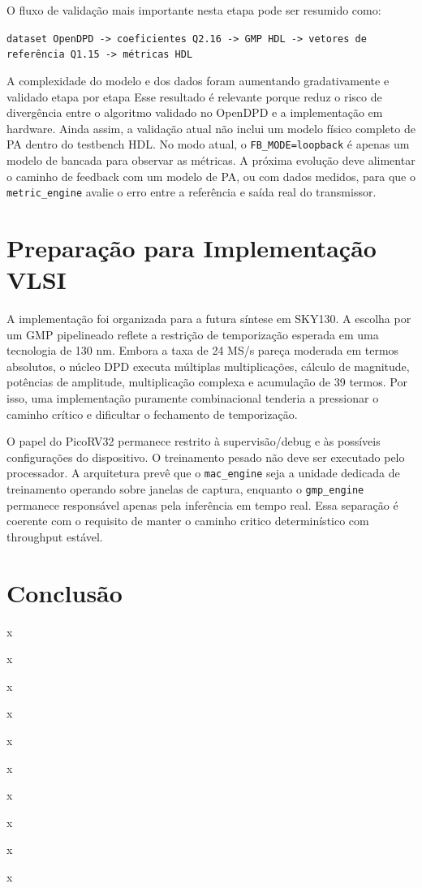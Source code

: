 \documentclass[journal,comsoc]{IEEEtran}
\begin{document}
O fluxo de validação mais importante nesta etapa pode ser resumido como:

\begin{center}
\texttt{dataset OpenDPD -> coeficientes Q2.16 -> GMP HDL -> vetores de referência Q1.15 -> métricas HDL}
\end{center}

A complexidade do modelo e dos dados foram aumentando gradativamente e validado etapa por etapa
Esse resultado é relevante porque reduz o risco de divergência entre o algoritmo validado no OpenDPD e a implementação em hardware. Ainda assim, a validação atual não inclui um modelo físico completo de PA dentro do testbench HDL. No modo atual, o \texttt{FB\_MODE=loopback} é apenas um modelo de bancada para observar as métricas. A próxima evolução deve alimentar o caminho de feedback com um modelo de PA, ou com dados medidos, para que o \texttt{metric\_engine} avalie o erro entre a referência e saída real do transmissor.

\section{Preparação para Implementação VLSI}
A implementação foi organizada para a futura síntese em SKY130. A escolha por um GMP pipelineado reflete a restrição de temporização esperada em uma tecnologia de 130 nm. Embora a taxa de 24 MS/s pareça moderada em termos absolutos, o núcleo DPD executa múltiplas multiplicações, cálculo de magnitude, potências de amplitude, multiplicação complexa e acumulação de 39 termos. Por isso, uma implementação puramente combinacional tenderia a pressionar o caminho crítico e dificultar o fechamento de temporização.

O papel do PicoRV32 permanece restrito à supervisão/debug e às possíveis configurações do dispositivo. O treinamento pesado não deve ser executado pelo processador. A arquitetura prevê que o \texttt{mac\_engine} seja a unidade dedicada de treinamento operando sobre janelas de captura, enquanto o \texttt{gmp\_engine} permanece responsável apenas pela inferência em tempo real. Essa separação é coerente com o requisito de manter o caminho critico determinístico com throughput estável.

\section{Conclusão}
x

x

x

x

x

x

x

x

x

x



\end{document}
